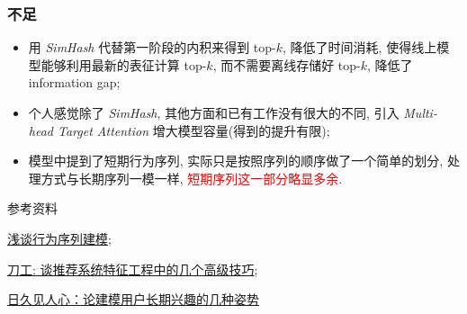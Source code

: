 \subsubsection{不足}
\begin{itemize}
	\item 用 \textit{SimHash} 代替第一阶段的内积来得到 top-$k$, 降低了时间消耗, 使得线上模型能够利用最新的表征计算 top-$k$, 而不需要离线存储好 top-$k$, 降低了 information gap;
	\vskip5pt
	
	\item 个人感觉除了 \textit{SimHash}, 其他方面和已有工作没有很大的不同, 引入 \textit{Multi-head Target Attention} 增大模型容量(得到的提升有限);
	\vskip5pt 
	
	\item 模型中提到了短期行为序列, 实际只是按照序列的顺序做了一个简单的划分, 处理方式与长期序列一模一样, \textcolor{red}{短期序列这一部分略显多余}.
\end{itemize}

参考资料
\begin{myitemize}
	\item \href{https://mp.weixin.qq.com/s?__biz=MzU0MDA1MzI0Mw==&mid=2247488129&idx=1&sn=ed882611a06b75e8e819b519010e9e81&chksm=fb3e4915cc49c003cb4505d0b09f06fa1c4e92409270b49f5509f1902774234382ba05b400d8&scene=21#wechat_redirect}{浅谈行为序列建模};
	
	\item \href{https://mp.weixin.qq.com/s?__biz=MzI5NTU2ODQzMg==&mid=2247484150&idx=1&sn=3bdb017a542bc2e2b94404f46ec9eb4f&chksm=ec50d7a9db275ebfdc009e6be3ea6a0ee8209477dafc99bc8a6a212fa0456a14bf4453b826dd&scene=21#wechat_redirect}{刀工: 谈推荐系统特征工程中的几个高级技巧};
	
	\item \href{https://mp.weixin.qq.com/s/o04b8gN4TYecKHopXGMuVg}{日久见人心：论建模用户长期兴趣的几种姿势}
\end{myitemize}